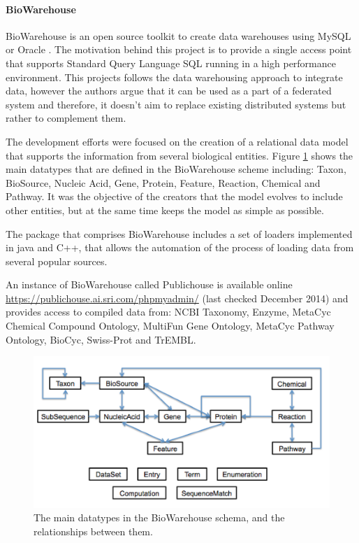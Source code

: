 \paragraph{BioWarehouse}
BioWarehouse is an open source toolkit to create data warehouses using MySQL or Oracle \cite{LEE2006}. The motivation behind this project is to provide  a single access point that supports Standard Query Language SQL running in a high performance environment.
This projects follows the data warehousing approach to integrate data, however the authors argue that it can be used as a part of a federated system and therefore, it doesn't aim to replace existing distributed systems but rather to complement them.

The development efforts were focused on the creation of a relational data model that supports the information from several biological entities. Figure \ref{fig:biowarehouse} shows the main datatypes that are defined in the BioWarehouse scheme including: Taxon, BioSource, Nucleic Acid, Gene, Protein, Feature, Reaction, Chemical and Pathway. It was the objective of the creators that the model evolves to include other entities, but at the same time keeps the model as simple as possible.

The package that comprises BioWarehouse includes a set of loaders implemented in java and C++, that allows the automation of the process of loading data from several popular sources. 

An instance of BioWarehouse called Publichouse is available online \url{https://publichouse.ai.sri.com/phpmyadmin/} (last checked December 2014) and provides access to compiled data from: NCBI Taxonomy, Enzyme, MetaCyc Chemical Compound Ontology, MultiFun Gene Ontology, MetaCyc Pathway Ontology, BioCyc, Swiss-Prot and TrEMBL.

\begin{figure}  
\centering
\includegraphics[width=\textwidth]{figures/biowarehouse.png}
\caption[Original BioWarehouse schema.]{The main datatypes in the BioWarehouse schema, and the relationships between them.
\label{fig:biowarehouse}}
\end{figure}

